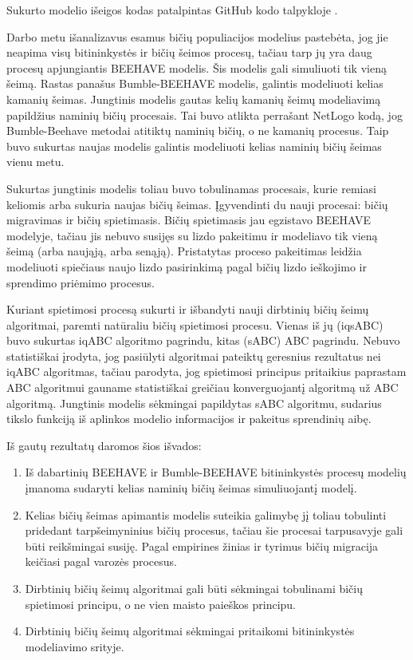 \documentclass{VUMIFKompMagistrinis}
\begin{document}
Sukurto modelio išeigos kodas patalpintas GitHub kodo talpykloje \cite{Veg20}. 




Darbo metu išanalizavus  esamus bičių populiacijos modelius pastebėta, jog jie neapima visų bitininkystės ir bičių šeimos procesų, tačiau tarp jų yra daug procesų apjungiantis BEEHAVE modelis. Šis modelis gali simuliuoti tik vieną šeimą. Rastas panašus Bumble-BEEHAVE modelis, galintis modeliuoti kelias kamanių šeimas. Jungtinis modelis gautas kelių kamanių šeimų modeliavimą papildžius naminių bičių procesais. Tai buvo atlikta perrašant NetLogo kodą, jog Bumble-Beehave metodai atitiktų naminių bičių, o ne kamanių procesus. Taip buvo sukurtas naujas modelis galintis modeliuoti kelias naminių bičių šeimas vienu metu.

Sukurtas jungtinis modelis toliau buvo tobulinamas procesais, kurie remiasi keliomis arba sukuria naujas bičių šeimas. Įgyvendinti du nauji procesai: bičių migravimas ir bičių spietimasis. Bičių spietimasis jau egzistavo BEEHAVE modelyje, tačiau jis nebuvo susijęs su lizdo pakeitimu ir modeliavo tik vieną šeimą (arba naująją, arba senąją). Pristatytas proceso pakeitimas leidžia modeliuoti spiečiaus naujo lizdo pasirinkimą pagal bičių lizdo ieškojimo ir sprendimo priėmimo procesus.

Kuriant spietimosi procesą sukurti ir išbandyti nauji dirbtinių bičių šeimų algoritmai, paremti natūraliu bičių spietimosi procesu. Vienas iš jų (iqsABC) buvo sukurtas iqABC algoritmo pagrindu, kitas (sABC) ABC pagrindu. Nebuvo statistiškai įrodyta, jog pasiūlyti algoritmai pateiktų geresnius rezultatus nei iqABC algoritmas, tačiau parodyta, jog spietimosi principus pritaikius paprastam ABC algoritmui gauname statistiškai greičiau konverguojantį algoritmą už ABC algoritmą. Jungtinis modelis sėkmingai papildytas sABC algoritmu, sudarius tikslo funkciją iš aplinkos modelio informacijos ir pakeitus sprendinių aibę.

Iš gautų rezultatų daromos šios išvados:
\begin{enumerate}
    \item Iš dabartinių BEEHAVE ir Bumble-BEEHAVE bitininkystės procesų modelių įmanoma sudaryti kelias naminių bičių šeimas simuliuojantį modelį.
    \item Kelias bičių šeimas apimantis modelis suteikia galimybę jį toliau tobulinti pridedant tarpšeimyninius bičių procesus, tačiau šie procesai tarpusavyje gali būti reikšmingai susiję. Pagal empirines žinias ir tyrimus bičių migracija keičiasi pagal varozės procesus.
    \item Dirbtinių bičių šeimų algoritmai gali būti sėkmingai tobulinami bičių spietimosi principu, o ne vien maisto paieškos principu.
    \item Dirbtinių bičių šeimų algoritmai sėkmingai pritaikomi bitininkystės modeliavimo srityje.
\end{enumerate}
\end{document}
